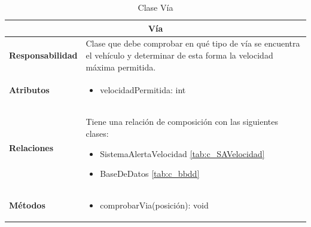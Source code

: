 







\begin{table}[H]
\begin{center}
\begin{tabular}{p{} p{11cm}}
\multicolumn{2}{c}{\textbf{Vía} } \\ \hline \hline
\textbf{Responsabilidad} &  Clase que debe comprobar en qué tipo de vía se encuentra el vehículo y determinar de esta forma la velocidad máxima permitida.  \\ \hline
\textbf{Atributos} & \begin{itemize}
                      \item velocidadPermitida: int
                    \end{itemize}\\ \hline
\textbf{Relaciones} & \par Tiene una relación de composición con las siguientes clases:
                      \begin{itemize}
                        \item SistemaAlertaVelocidad \ref{tab:c_SAVelocidad}
                        \item BaseDeDatos \ref{tab:c_bbdd}
                      \end{itemize}

                      \\ \hline

\textbf{Métodos} &  \begin{itemize}
                      \item comprobarVia(posición): void
                    \end{itemize}\\ \hline
\end{tabular}
\caption{Clase Vía}
\label{tab:c_via}
\end{center}
\end{table}








